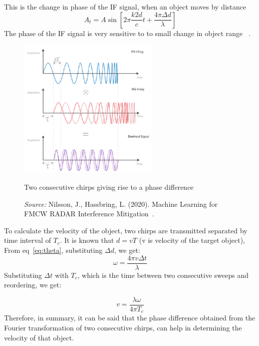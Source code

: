 This is the change in phase of the IF signal, when an object moves by distance 
\begin{equation}\label{eq:eq1}
A_{t}= A\sin[2\pi \frac{k2d}{c}t + \frac{4\pi \Delta d}{\lambda}]
\end{equation}
The phase of the IF signal is very sensitive to to small change in object range ~\cite{rao_2017}.

 \begin{figure}[ht]
  \begin{center}
    \includegraphics[width=0.6\textwidth]{Master's thesis/images/delay_sweeps.PNG} 
     
    \caption{Two consecutive chirps giving rise to a phase difference}
    \caption*{\textit{Source:} Nilsson, J., Hassbring, L. (2020). Machine Learning for FMCW RADAR Interference Mitigation~\cite{nilsson2020machine}.}
    

    \label{fig:delay}
  \end{center}
\end{figure}  

To calculate the velocity of the object, two chirps are transmitted separated by time interval of $T_{c}$.
It is known that $d= vT$ (v is velocity of the target object), From eq~\eqref{eq:theta}, substituting $\Delta d$, we get:
\begin{equation}
    \omega= \frac{4\pi v \Delta t}{\lambda}
\end{equation}
Substituting $\Delta t$ with $T_{c}$, which is the time between two consecutive sweeps and reordering, we get:

\begin{equation}
    v= \frac{\lambda \omega}{4\pi T_{c}}
\end{equation}
Therefore, in summary, it can be said that the phase difference obtained from the Fourier transformation of two consecutive chirps, can help in determining the velocity of that object. 

